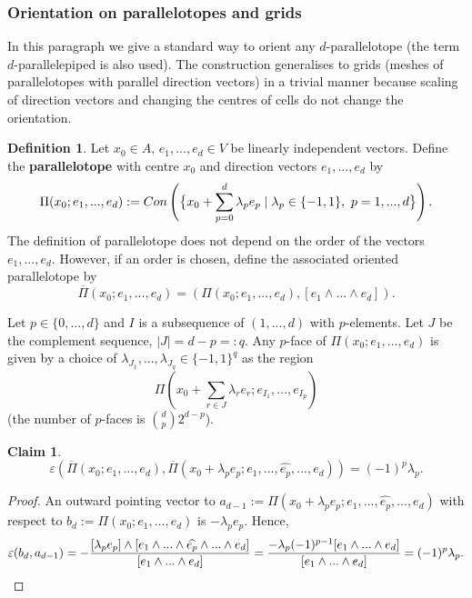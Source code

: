 \documentclass{elsarticle}
\theoremstyle{definition}
\newtheorem{claim}[theorem]{Claim}
\newtheorem{definition}[theorem]{Definition}
\newcommand{\abs}[1]{\left\lvert#1\right\rvert}
\newcommand{\Con}{\mathop{\rm Con}\nolimits} %
\begin{document}
\subsubsection{Orientation on parallelotopes and grids}
\label{sec:parallelotope}
In this paragraph we give a standard way to orient  any $d$-parallelotope (the term $d$-parallelepiped is also used). The construction generalises to grids (meshes of parallelotopes with parallel direction vectors) in a trivial manner because scaling of direction vectors and changing the centres of cells do not change the orientation.
\begin{definition}
  Let $x_0 \in A$, $e_1, ..., e_d \in V$ be linearly independent vectors. Define the \textbf{parallelotope} with centre $x_0$ and direction vectors $e_1, ..., e_d$ by
  \begin{equation*}
    \Pi(x_0; e_1, ..., e_d) := \Con\left(\big\{x_0 + \sum_{p = 0}^{d} \lambda_p e_p \mid \lambda_p \in \{-1, 1\},\ p = 1, ..., d\big\}\right).
  \end{equation*}
  The definition of parallelotope does not depend on the order of the vectors $e_1, ..., e_d$. However, if an order is chosen, define the associated oriented parallelotope by
  \begin{equation*}
    \overline{\Pi}(x_0; e_1, ..., e_d) = (\Pi(x_0; e_1, ..., e_d), [e_1 \wedge ... \wedge e_d]).
  \end{equation*}
\end{definition}
Let $p \in \{0, ..., d\}$ and $I$ is a subsequence of $(1, ..., d)$ with $p$-elements. Let $J$ be the complement sequence, $\abs{J} = d - p =:q$. Any $p$-face of $\Pi(x_0; e_1, ..., e_d)$ is given by a choice of $\lambda_{J_1}, ..., \lambda_{J_q} \in \{-1, 1\}^q$ as the region
\begin{equation}
  \Pi\left(x_0 + \sum_{r \in J} \lambda_r e_r; e_{I_1}, ..., e_{I_p}\right)
\end{equation}
(the number of $p$-faces is $\binom{d}{p} 2^{d - p}$).
\begin{claim}
  \begin{equation*}
    \varepsilon
      \left(
        \overline{\Pi}(x_0; e_1, ..., e_d),
        \overline{\Pi}\left(x_0 + \lambda_p e_p; e_1, ..., \widehat{e_p}, ...,  e_d\right)
      \right)
      = (-1)^p \lambda_p.
  \end{equation*}
\end{claim}
\begin{proof}
  An outward pointing vector to $a_{d - 1} := \Pi\left(x_0 + \lambda_p e_p; e_1, ..., \widehat{e_p}, ...,  e_d\right)$ with respect to $b_d := \Pi(x_0; e_1, ..., e_d)$ is $- \lambda_p e_p$. Hence,
  \begin{equation*}
    \varepsilon(b_d, a_{d -1})
      = - \frac{[\lambda_p e_p] \wedge [e_1 \wedge ... \wedge \widehat{e_p} \wedge ... \wedge e_d]}{[e_1 \wedge ... \wedge e_d]}
      = \frac{-\lambda_p (-1)^{p - 1} [e_1 \wedge ... \wedge e_d]}{[e_1 \wedge ... \wedge e_d]}
      = (-1)^p \lambda_p. \qedhere
  \end{equation*}
\end{proof}
\end{document}
